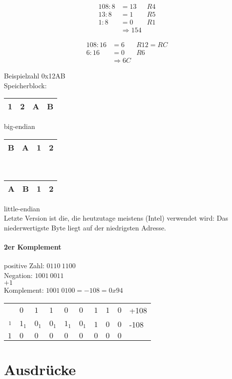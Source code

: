 \begin{align*}
108:8 &= 13 &R4\\
13:8 &= 1 &R5\\
1:8 &= 0 &R1\\
&\Rightarrow 154&
\end{align*}

\begin{align*}
108: 16 &= 6 &R12 = RC\\
6:16 &= 0 &R6\\
&\Rightarrow 6C&
\end{align*}

Beispielzahl 0x12AB\medskip\\
Speicherblock:\\
\begin{tabular}{|l|l|l|l|}
\hline
1&2&A&B\\
\hline
\end{tabular} big-endian\\
\begin{tabular}{|l|l|l|l|}
\hline
B&A&1&2\\
\hline
\end{tabular}\\
\begin{tabular}{|l|l|l|l|}
\hline
A&B&1&2\\
\hline
\end{tabular} little-endian\\
Letzte Version ist die, die heutzutage meistens (Intel) verwendet wird: Das niederwertigste Byte liegt auf der niedrigsten Adresse.

\paragraph{2er Komplement}
positive Zahl: $\boxed{0}110 \: 1100$\\
Negation: $1001\: 0011$\\
$+1$\\
Komplement: $1001 \: 0100 = -108 = 0x94$\\
\begin{tabular}{r | l l l l l l l l l}
 & $0$&$1$&$1$&$0$&$0$&$1$&$1$&$0$ & +108\\
$_1$&$1_1$&$0_1$&$0_1$&$1_1$&$0_1$&$1$&$0$&$0$ & -108\\
\hline
$1$&$0$&$0$&$0$&$0$&$0$&$0$&$0$&$0$&\\

\end{tabular}

\section{Ausdrücke}

